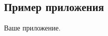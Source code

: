 
\begin{appendices}
    \section{Пример приложения}\label{app:example}
    Ваше приложение.
\end{appendices}
